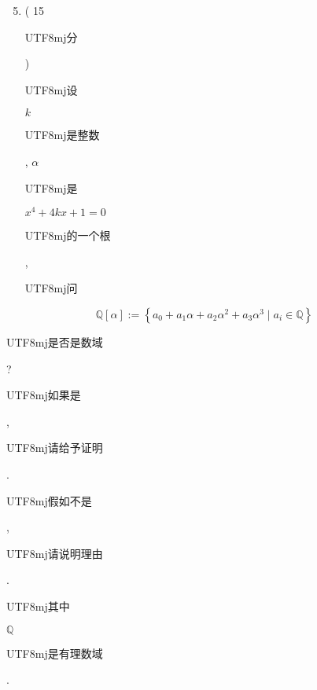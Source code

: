 \documentclass[10pt]{article}
\begin{document}
\begin{enumerate}
  \setcounter{enumi}{4}
  \item ( 15 \begin{CJK}{UTF8}{mj}分\end{CJK}) \begin{CJK}{UTF8}{mj}设\end{CJK} $k$ \begin{CJK}{UTF8}{mj}是整数\end{CJK}, $\alpha$ \begin{CJK}{UTF8}{mj}是\end{CJK} $x^{4}+4 k x+1=0$ \begin{CJK}{UTF8}{mj}的一个根\end{CJK}, \begin{CJK}{UTF8}{mj}问\end{CJK}
\end{enumerate}
$$
\mathbb{Q}[\alpha]:=\left\{a_{0}+a_{1} \alpha+a_{2} \alpha^{2}+a_{3} \alpha^{3} \mid a_{i} \in \mathbb{Q}\right\}
$$
\begin{CJK}{UTF8}{mj}是否是数域\end{CJK}? \begin{CJK}{UTF8}{mj}如果是\end{CJK}, \begin{CJK}{UTF8}{mj}请给予证明\end{CJK}. \begin{CJK}{UTF8}{mj}假如不是\end{CJK}, \begin{CJK}{UTF8}{mj}请说明理由\end{CJK}. \begin{CJK}{UTF8}{mj}其中\end{CJK} $\mathbb{Q}$ \begin{CJK}{UTF8}{mj}是有理数域\end{CJK}.
\end{document}
